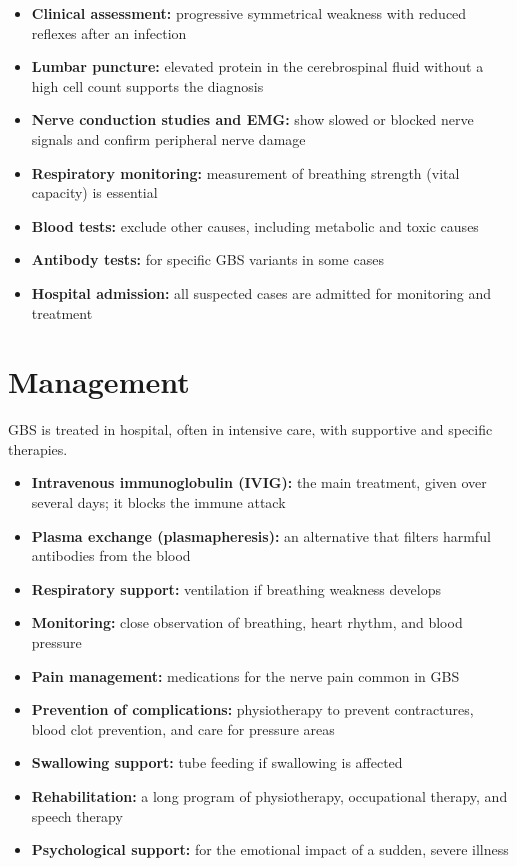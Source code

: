 \begin{itemize}
    \item \textbf{Clinical assessment:} progressive symmetrical weakness with reduced reflexes after an infection
    \item \textbf{Lumbar puncture:} elevated protein in the cerebrospinal fluid without a high cell count supports the diagnosis
    \item \textbf{Nerve conduction studies and EMG:} show slowed or blocked nerve signals and confirm peripheral nerve damage
    \item \textbf{Respiratory monitoring:} measurement of breathing strength (vital capacity) is essential
    \item \textbf{Blood tests:} exclude other causes, including metabolic and toxic causes
    \item \textbf{Antibody tests:} for specific GBS variants in some cases
    \item \textbf{Hospital admission:} all suspected cases are admitted for monitoring and treatment
\end{itemize}

\section*{Management}
GBS is treated in hospital, often in intensive care, with supportive and specific therapies.

\begin{itemize}
    \item \textbf{Intravenous immunoglobulin (IVIG):} the main treatment, given over several days; it blocks the immune attack
    \item \textbf{Plasma exchange (plasmapheresis):} an alternative that filters harmful antibodies from the blood
    \item \textbf{Respiratory support:} ventilation if breathing weakness develops
    \item \textbf{Monitoring:} close observation of breathing, heart rhythm, and blood pressure
    \item \textbf{Pain management:} medications for the nerve pain common in GBS
    \item \textbf{Prevention of complications:} physiotherapy to prevent contractures, blood clot prevention, and care for pressure areas
    \item \textbf{Swallowing support:} tube feeding if swallowing is affected
    \item \textbf{Rehabilitation:} a long program of physiotherapy, occupational therapy, and speech therapy
    \item \textbf{Psychological support:} for the emotional impact of a sudden, severe illness
\end{itemize}

